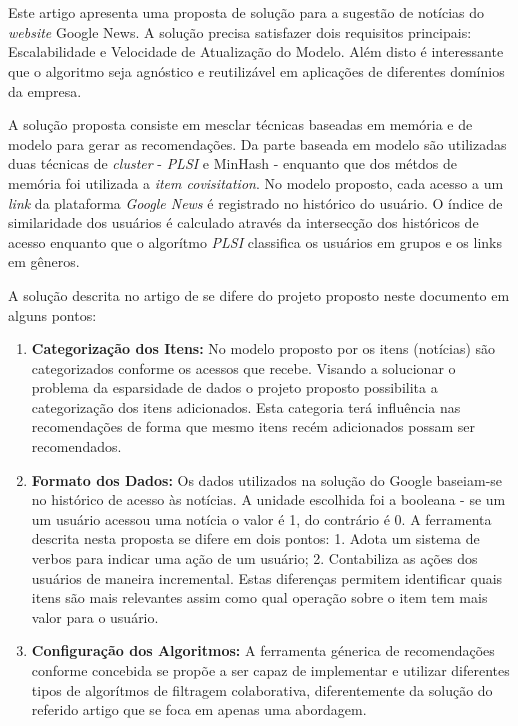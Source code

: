 \documentclass[
	12pt,				%
    oneside,			%
	a4paper,			%
	english,			%
	french,				%
	spanish,			%
	brazil,				%
	]{abntex2}
\begin{document}
\section{}
Este artigo apresenta uma proposta de solução para a sugestão de notícias do \textit{website} Google News. A solução precisa satisfazer dois requisitos principais:
Escalabilidade e Velocidade de Atualização do Modelo. Além disto é interessante que o algoritmo seja agnóstico e reutilizável em aplicações de diferentes domínios 
da empresa.

A solução proposta consiste em mesclar técnicas baseadas em memória e de modelo para gerar as recomendações. Da parte baseada em modelo são utilizadas duas técnicas
de \textit{cluster} - \textit{PLSI} e MinHash - enquanto que dos métdos de memória foi utilizada a \textit{item covisitation}. No modelo proposto, cada acesso a um 
\textit{link} da plataforma \textit{Google News} é registrado no histórico do usuário. O índice de similaridade dos usuários é calculado através da intersecção dos
históricos de acesso enquanto que o algorítmo \textit{PLSI} classifica os usuários em grupos e os links em gêneros.

A solução descrita no artigo de  se difere do projeto proposto neste documento em alguns pontos:

\begin{enumerate}
	\item \textbf{Categorização dos Itens:} No modelo proposto por  os itens (notícias) são categorizados conforme os acessos que recebe. Visando a solucionar
	o problema da esparsidade de dados o projeto proposto possibilita a categorização dos itens adicionados. Esta categoria terá influência nas recomendações de forma que mesmo itens recém adicionados
	possam ser recomendados.
	\item \textbf{Formato dos Dados:} Os dados utilizados na solução do Google baseiam-se no histórico de acesso às notícias. A unidade escolhida foi a booleana - se um
	um usuário acessou uma notícia o valor é 1, do contrário é 0. A ferramenta descrita nesta proposta se difere em dois pontos: 1. Adota um sistema de verbos para indicar uma ação de um usuário;
	2. Contabiliza as ações dos usuários de maneira incremental. Estas diferenças permitem identificar quais itens são mais relevantes assim como qual operação sobre o item tem mais valor para o usuário.
	\item \textbf{Configuração dos Algoritmos:} A ferramenta génerica de recomendações conforme concebida se propõe a ser capaz de implementar e utilizar diferentes tipos de algorítmos de filtragem colaborativa,
	diferentemente da solução do referido artigo que se foca em apenas uma abordagem.
\end{enumerate}
\end{document}
